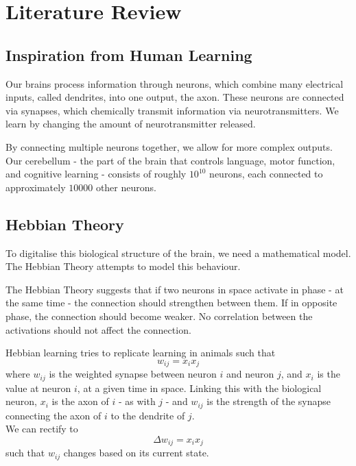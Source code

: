 \section{Literature Review}
\label{litreview}

\subsection{Inspiration from Human Learning}
\label{human}

Our brains process information through neurons, which combine many electrical inputs, called dendrites, into one output, the axon. These neurons are connected via synapses, which chemically transmit information via neurotransmitters. We learn by changing the amount of neurotransmitter released.

By connecting multiple neurons together, we allow for more complex outputs. Our cerebellum - the part of the brain that controls language, motor function, and cognitive learning - consists of roughly $10^{10}$ neurons, each connected to approximately $10000$ other neurons.

\subsection{Hebbian Theory}
\label{hebb}

To digitalise this biological structure of the brain, we need a mathematical model. The Hebbian Theory attempts to model this behaviour.

The Hebbian Theory suggests that if two neurons in space activate in phase - at the same time - the connection should strengthen between them. If in opposite phase, the connection should become weaker. No correlation between the activations should not affect the connection.

Hebbian learning tries to replicate learning in animals such that 
\begin{equation}
w_{ij}=x_ix_j 
\label{eq:hebb}
\end{equation}
where $w_{ij}$ is the weighted synapse between neuron $i$ and neuron $j$, and $x_i$ is the value at neuron $i$, at a given time in space. Linking this with the biological neuron, $x_i$ is the axon of $i$ - as with $j$ - and $w_{ij}$ is the strength of the synapse connecting the axon of $i$ to the dendrite of $j$.\\
We can rectify  to 
\begin{equation} 
\Delta w_{ij}=x_ix_j
\label{eq:dhebb}
\end{equation}
such that $w_{ij}$ changes based on its current state.

